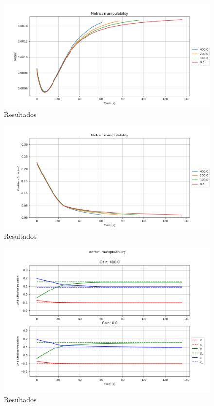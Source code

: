\begin{figure}
    \centering
    \includegraphics[width=1.0\textwidth]{Images/manipulability/metric_manipulability.png}
    \caption{Resultados}\label{fig:m-m}
\end{figure}

\begin{figure}
    \centering
    \includegraphics[width=1.0\textwidth]{Images/manipulability/position_error_manipulability.png}
    \caption{Resultados}\label{fig:m-e}
\end{figure}

\begin{figure}
    \centering
    \includegraphics[width=1.0\textwidth]{Images/manipulability/position_manipulability.png}
    \caption{Resultados}\label{fig:m-p}
\end{figure}
